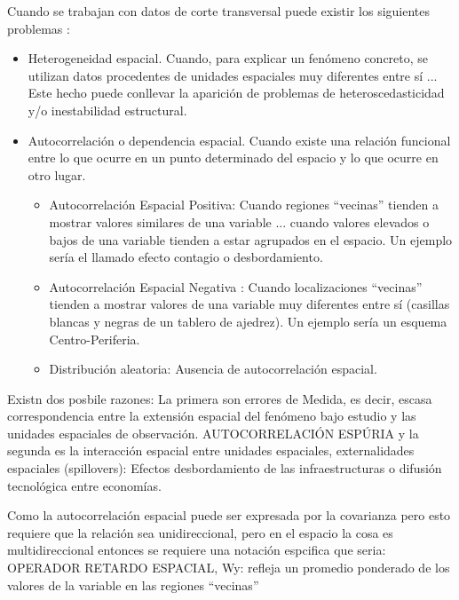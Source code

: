 Cuando se trabajan con datos de corte transversal puede existir los siguientes problemas \cite{torres_ant}: 

\begin{itemize}
    \item Heterogeneidad espacial. Cuando, para explicar un fenómeno concreto,
     se utilizan datos procedentes de unidades espaciales muy diferentes entre sí ...           
     Este hecho puede conllevar la aparición de problemas de heteroscedasticidad y/o 
     inestabilidad estructural.

     \item Autocorrelación o dependencia espacial. Cuando existe una relación funcional 
     entre lo que ocurre en un punto determinado del espacio y lo que ocurre en otro lugar. 
     \begin{itemize}
        \item Autocorrelación Espacial Positiva: Cuando regiones “vecinas” tienden 
        a mostrar valores similares de una variable ... cuando valores elevados 
        o bajos de una variable tienden a estar agrupados en el espacio. 
        Un ejemplo sería el llamado efecto contagio o desbordamiento.
        \item Autocorrelación Espacial Negativa : Cuando localizaciones “vecinas” tienden a mostrar valores de una variable muy diferentes entre sí (casillas blancas y negras de un tablero de ajedrez). Un ejemplo sería un esquema Centro-Periferia.
        \item Distribución aleatoria: Ausencia de autocorrelación espacial.
     \end{itemize}

\end{itemize}

Existn dos posbile razones: La primera son errores de Medida, es decir, escasa correspondencia
 entre la extensión espacial del fenómeno bajo estudio y las unidades espaciales de observación.  
 AUTOCORRELACIÓN ESPÚRIA y la segunda es la interacción espacial entre unidades espaciales, 
 externalidades espaciales (spillovers): Efectos desbordamiento de las infraestructuras o 
 difusión tecnológica entre economías.
     
Como la autocorrelación espacial puede ser expresada por la covarianza  
pero esto requiere que la relación sea unidireccional, pero en el espacio la cosa es 
multidireccional entonces se requiere una notación espcifica que seria: 
OPERADOR RETARDO ESPACIAL, Wy: refleja un promedio ponderado de los valores de la 
variable en las regiones “vecinas” \cite{torres_ant}





